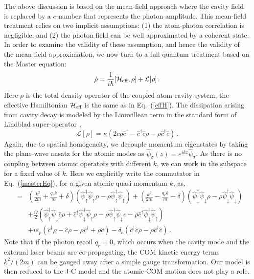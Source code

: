 \documentclass[atoms,article,submit,moreauthors,dvi2pdf,12pt,a4paper]{mdpi}
\def\be{\begin{equation}}
\def\ee{\end{equation}}
\def\ba{\begin{eqnarray}}
\def\ea{\end{eqnarray}}
\begin{document}
The above discussion is based on the mean-field approach where the cavity field is replaced by a $c$-number that represents the photon amplitude. This mean-field treatment relies on two implicit assumptions: (1) the atom-photon correlation is negligible, and (2) the photon field can be well approximated by a coherent state. In order to examine the validity of these assumption, and hence the validity of the mean-field approximation, we now turn to a full quantum treatment based on the Master equation:
\be
\dot{\rho} = \frac{1}{i\hbar}[{\cal H}_{\text{eff}},\rho]+\mathcal{L}[\rho] \,. \label{masterEq}
\ee
Here $\rho$ is the total density operator of the coupled atom-cavity system, the effective Hamiltonian ${\cal H}_{\text{eff}}$ is the same as in Eq.~(\ref{effH}). The dissipation arising from cavity decay is modeled by the Liouvillean term in the
standard form of Lindblad super-operator \cite{L1, L2},
\be
\mathcal{L}[\rho] = \kappa (2c\rho \hat{c}^\dagger-\hat{c}^\dagger \hat{c}\rho-\rho \hat{c}^\dagger \hat{c})\,.\label{Lindblad}
\ee
Again, due to spatial homogeneity, we decouple momentum eigenstates by taking the plane-wave ansatz for the atomic modes as $\hat{\psi}_\sigma({z})=e^{i{k}{z}}\hat{\psi}_\sigma$. As there is no coupling between atomic operators with different $k$, we can work in the subspace for a fixed value of $k$. Here we explicitly write the commutator in Eq.~(\ref{masterEq}), for a given atomic quasi-momentum $k$, as,
\ba
[{\cal H}_{\text{eff}}({k}),\rho] & = & \left(\frac{{ k}^{2}}{2m}+\frac{q_{r}k}{m}+\delta\right)\left(\hat{\psi}_{\uparrow}^{\dagger} \hat{\psi}_{\uparrow}\rho-\rho \hat{\psi}_{\uparrow}^{\dagger} \hat{\psi}_{\uparrow}\right)+\left(\frac{{k}^{2}}{2m}-\frac{q_{r}k}{m}-\delta\right) \left(\hat{\psi}_{\downarrow}^{\dagger} \hat{\psi}_{\downarrow}\rho-\rho \hat{\psi}_{\downarrow}^{\dagger} \hat{\psi}_{\downarrow}\right)\nonumber\\
 &  & + \frac{\Omega}{2}\left(\hat{\psi}_{\uparrow}^{\dagger} \hat{\psi}_{\downarrow} \hat{c} \rho+\hat{c}^{\dagger} \hat{\psi}_{\downarrow}^{\dagger} \hat{\psi}_{\uparrow}\rho-\rho \hat{\psi}_{\uparrow}^{\dagger} \hat{\psi}_{\downarrow}c-\rho \hat{c}^{\dagger} \hat{\psi}_{\downarrow}^{\dagger} \hat{\psi}_{\uparrow}\right)\nonumber\\
&& + i\varepsilon_{p}\left(\hat{c}^{\dagger}\rho-\hat{c}\rho-\rho \hat{c}^{\dagger}+\rho \hat{c}\right)-\delta_{c}\left(\hat{c}^{\dagger}\hat{c}\rho-\rho \hat{c}^{\dagger}\hat{c}\right)\,.
\ea
Note that if the photon recoil $q_r=0$, which occurs when the cavity mode and the external laser beams are co-propagating, the COM kinetic energy terms $k^2/(2m)$ can be gauged away after a simple gauge transformation. Our model is then reduced to the J-C model and the atomic COM motion does not play a role.
\end{document}
